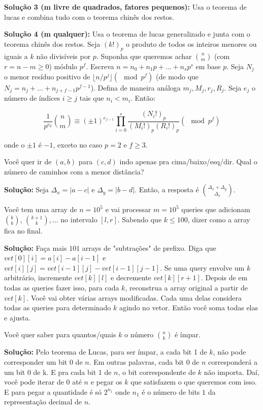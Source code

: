 \textbf{Solução 3 (m livre de quadrados, fatores pequenos):} Usa o teorema de lucas e combina tudo com o teorema chinês dos restos.

\textbf{Solução 4 (m qualquer):} Usa o teorema de lucas generalizado e junta com o teorema chinês dos restos. Seja $(k!)_p$ o produto de todos os inteiros menores ou iguais a $k$ não divisíveis por $p$. Suponha que queremos achar ${n \choose m}$ (com $r = n - m \geq 0$) módulo $p^f$. Escreva $n = n_0 + n_1 p + \dots + n_s p^s$ em base $p$. Seja $N_j$ o menor resíduo positivo de $\lfloor n/p^j \rfloor ( \mod p^f)$ (de modo que $N_j = n_j + \dots + n_{j+f-1} p^{f-1}$). Defina de maneira análoga $m_j, M_j, r_j, R_j$. Seja $e_j$ o número de índices $i \geq j$ tais que $n_i < m_i$. Então:

$$\dfrac{1}{p^{e_0}} {n \choose m} \equiv (\pm 1)^{e_{f-1}} \prod\limits_{i=0}^s \dfrac{(N_i!)_p}{(M_i!)_p (R_i!)_p} ( \mod p^f)$$

onde o $\pm 1$ é $-1$, exceto no caso $p=2$ e $f \geq 3$.

 Você quer ir de $(a,b)$ para $(c, d)$ indo apenas pra cima/baixo/esq/dir. Qual o número de caminhos com a menor distância?

\textbf{Solução:} Seja $\Delta_x = |a-c|$ e $\Delta_y = |b-d|$. Então, a resposta é ${\Delta_x + \Delta_y \choose \Delta_x}$.

 Você tem uma array de $n=10^5$ e vai processar $m=10^5$ queries que adicionam ${k \choose k}$, ${k+1 \choose k}, \dots$ no intervalo $[l, r]$. Sabendo que $k \leq 100$, dizer como a array fica no final.

\textbf{Solução:} Faça mais $101$ arrays de "subtrações" de prefixo. Diga que $vet[0][i] = a[i] - a[i-1]$ e $vet[i][j] = vet[i-1][j] - vet[i-1][j-1]$. Se uma query envolve um $k$ arbitrário, incremente $vet[k][l]$ e decremente $vet[k][r+1]$. Depois de em todas as queries fazer isso, para cada $k$, reconstrua a array original a partir de $vet[k]$. Você vai obter várias arrays modificadas. Cada uma delas considera todas as queries para determinado $k$ agindo no vetor. Então você soma todas elas e ajusta.

 Você quer saber para quantos/quais $k$ o número ${n \choose k}$ é ímpar.

\textbf{Solução:} Pelo teorema de Lucas, para ser ímpar, a cada bit 1 de $k$, não pode corresponder um bit $0$ de $n$. Em outras palavras, cada bit $0$ de $n$ corresponderá a um bit $0$ de k. E pra cada bit $1$ de $n$, o bit correspondente de $k$ não importa. Daí, você pode iterar de $0$ até $n$ e pegar os $k$ que satisfazem o que queremos com isso. E para pegar a quantidade é só $2^{n_1}$ onde $n_1$ é o número de bits $1$ da representação decimal de $n$.

